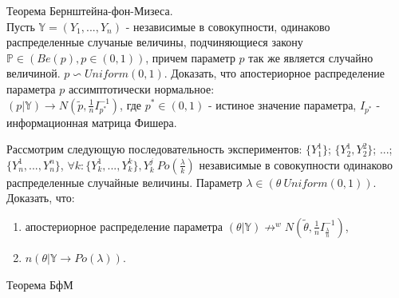 \begin{problem} Теорема Бернштейна-фон-Мизеса.\\
Пусть $\mathbb{Y} = (Y_1, ..., Y_n)$ - независимые в совокупности, одинаково распределенные случаные величины, подчиняющиеся закону $\mathbb{P} \in (Be(p), p \in (0, 1))$, причем параметр $p$ так же является случайно величиной. $p \backsim Uniform(0,1)$. Доказать, что апостериорное распределение параметра $p$ ассимптотически нормальное:\\
$(p|\mathbb{Y}) \rightarrow N(\tilde{p}, \frac{1}{n}I_{p^*}^{-1})$, где $p^* \in (0, 1)$ - истиное значение параметра, $I_{p^*}$ - информационная матрица Фишера.
\begin{ordre}
\end{ordre}
\end{problem}

\begin{problem}
Рассмотрим следующую последовательность экспериментов:
$\{Y_1^1\}$; $\{Y_2^1, Y_2^2\}$; ...;$\{Y_n^1,..., Y_n^n\}$, $\forall k: \{Y_k^1,...,Y_k^k\}, Y_k^j ~ Po(\frac{\lambda}{k})$ независимые в совокупности одинаково распределенные случайные величины. Параметр $\lambda \in (\theta ~ Uniform(0, 1))$. Доказать, что:
\begin{enumerate}
\item апостериорное распределение параметра $(\theta|\mathbb{Y}) \not\rightarrow^{w} N(\tilde{\theta},\frac{1}{n}I_{\frac{\lambda}{n}}^{-1} )$,
\item $n(\theta|\mathbb{Y} \rightarrow Po(\lambda))$.
\end{enumerate}
\end{problem}
\begin{remark} Теорема БфМ 
\end{remark}
